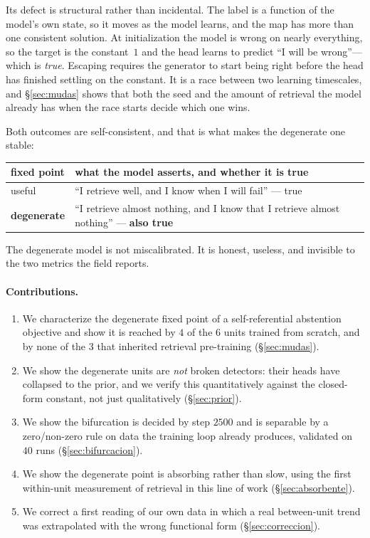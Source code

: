\documentclass[11pt,a4paper]{article}
\begin{document}
Its defect is structural rather than incidental. The label is a function of the model's own state, so
it moves as the model learns, and the map has more than one consistent solution. At initialization
the model is wrong on nearly everything, so the target is the constant~$1$ and the head learns to
predict ``I will be wrong''---which is \emph{true}. Escaping requires the generator to start being
right before the head has finished settling on the constant. It is a race between two learning
timescales, and \S\ref{sec:mudas} shows that both the seed and the amount of retrieval the model
already has when the race starts decide which one wins.

Both outcomes are self-consistent, and that is what makes the degenerate one stable:

\begin{center}
\begin{tabular}{ll}
\toprule
fixed point & what the model asserts, and whether it is true \\
\midrule
useful & ``I retrieve well, and I know when I will fail'' --- true \\
\textbf{degenerate} & ``I retrieve almost nothing, and I know that I retrieve almost nothing'' --- \textbf{also true} \\
\bottomrule
\end{tabular}
\end{center}

The degenerate model is not miscalibrated. It is honest, useless, and invisible to the two metrics
the field reports.

\paragraph{Contributions.}
\begin{enumerate}
\item We characterize the degenerate fixed point of a self-referential abstention objective and show
it is reached by $4$ of the $6$ units trained from scratch, and by none of the $3$ that inherited
retrieval pre-training (\S\ref{sec:mudas}).
\item We show the degenerate units are \emph{not} broken detectors: their heads have collapsed to the
prior, and we verify this quantitatively against the closed-form constant, not just qualitatively
(\S\ref{sec:prior}).
\item We show the bifurcation is decided by step $2500$ and is separable by a zero/non-zero rule on
data the training loop already produces, validated on $40$ runs (\S\ref{sec:bifurcacion}).
\item We show the degenerate point is absorbing rather than slow, using the first within-unit
measurement of retrieval in this line of work (\S\ref{sec:absorbente}).
\item We correct a first reading of our own data in which a real between-unit trend was extrapolated
with the wrong functional form (\S\ref{sec:correccion}).
\end{enumerate}
\end{document}
